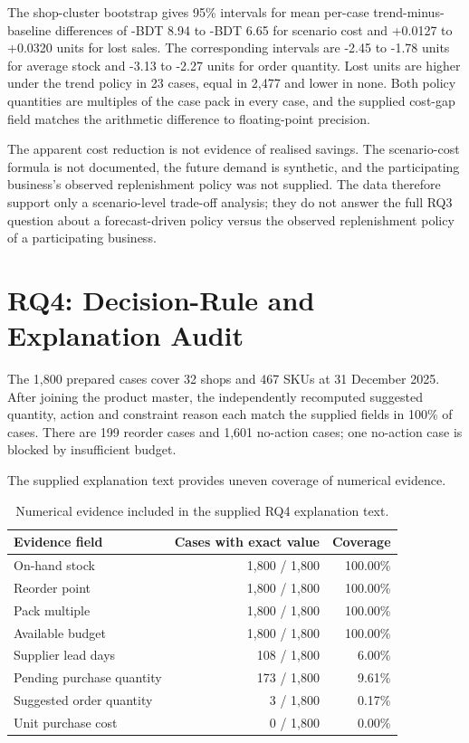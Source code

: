 The shop-cluster bootstrap gives 95\% intervals for mean per-case
trend-minus-baseline differences of -BDT 8.94 to -BDT 6.65 for scenario
cost and +0.0127 to +0.0320 units for lost sales. The corresponding
intervals are -2.45 to -1.78 units for average stock and -3.13 to -2.27
units for order quantity. Lost units are higher under the trend policy in
23 cases, equal in 2,477 and lower in none. Both policy quantities are
multiples of the case pack in every case, and the supplied cost-gap field
matches the arithmetic difference to floating-point precision.

The apparent cost reduction is not evidence of realised savings. The
scenario-cost formula is not documented, the future demand is synthetic,
and the participating business's observed replenishment policy was not supplied. The data therefore support only a scenario-level trade-off analysis; they
do not answer the full RQ3 question about a forecast-driven policy versus the observed replenishment policy of a participating business.

\section{RQ4: Decision-Rule and Explanation Audit}

The 1,800 prepared cases cover 32 shops and 467 SKUs at 31 December 2025.
After joining the product master, the independently recomputed suggested
quantity, action and constraint reason each match the supplied fields in
100\% of cases. There are 199 reorder cases and 1,601 no-action cases;
one no-action case is blocked by insufficient budget.

The supplied explanation text provides uneven coverage of numerical evidence.

\begin{table}[H]
\centering
\small
\caption{Numerical evidence included in the supplied RQ4 explanation text.}
\label{tab:rq4_supplied_explanation_coverage}
\begin{tabularx}{\textwidth}{|X|r|r|}
\hline
\textbf{Evidence field} & \textbf{Cases with exact value} & \textbf{Coverage} \\
\hline
On-hand stock & 1,800 / 1,800 & 100.00\% \\
\hline
Reorder point & 1,800 / 1,800 & 100.00\% \\
\hline
Pack multiple & 1,800 / 1,800 & 100.00\% \\
\hline
Available budget & 1,800 / 1,800 & 100.00\% \\
\hline
Supplier lead days & 108 / 1,800 & 6.00\% \\
\hline
Pending purchase quantity & 173 / 1,800 & 9.61\% \\
\hline
Suggested order quantity & 3 / 1,800 & 0.17\% \\
\hline
Unit purchase cost & 0 / 1,800 & 0.00\% \\
\hline
\end{tabularx}
\end{table}

